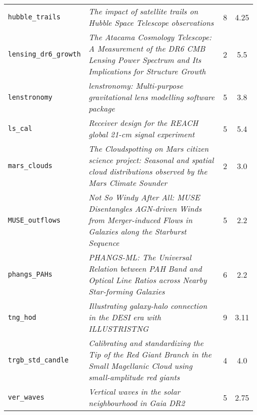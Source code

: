 \begin{table}[htbp]
\begin{tabular}{lp{7.5cm}cc}
\small\texttt{hubble\_trails} & \small\textit{The impact of satellite trails on Hubble Space Telescope observations} \citep{hubble_trails} & 8 & 4.25 \\
\small\texttt{lensing\_dr6\_growth} & \small\textit{The Atacama Cosmology Telescope: A Measurement of the DR6 CMB Lensing Power Spectrum and Its Implications for Structure Growth} \citep{lensing_dr6_growth} & 2 & 5.5 \\
\small\texttt{lenstronomy} & \small\textit{lenstronomy: Multi-purpose gravitational lens modelling software package} \citep{lenstronomy} & 5 & 3.8 \\
\small\texttt{ls\_cal} & \small\textit{Receiver design for the REACH global 21-cm signal experiment} \citep{ls_cal} & 5 & 5.4 \\
\small\texttt{mars\_clouds} & \small\textit{The Cloudspotting on Mars citizen science project: Seasonal and spatial cloud distributions observed by the Mars Climate Sounder} \citep{mars_clouds} & 2 & 3.0 \\
\small\texttt{MUSE\_outflows} & \small\textit{Not So Windy After All: MUSE Disentangles AGN-driven Winds from Merger-induced Flows in Galaxies along the Starburst Sequence} \citep{MUSE_outflows} & 5 & 2.2 \\
\small\texttt{phangs\_PAHs} & \small\textit{PHANGS-ML: The Universal Relation between PAH Band and Optical Line Ratios across Nearby Star-forming Galaxies} \citep{phangs_PAHs} & 6 & 2.2 \\
\small\texttt{tng\_hod} & \small\textit{Illustrating galaxy-halo connection in the DESI era with ILLUSTRISTNG} \citep{tng_hod} & 9 & 3.11 \\
\small\texttt{trgb\_std\_candle} & \small\textit{Calibrating and standardizing the Tip of the Red Giant Branch in the Small Magellanic Cloud using small-amplitude red giants} \citep{trgb_std_candle} & 4 & 4.0 \\
\small\texttt{ver\_waves} & \small\textit{Vertical waves in the solar neighbourhood in Gaia DR2} \citep{ver_waves} & 5 & 2.75 \\
\bottomrule
\end{tabular}
\end{table}